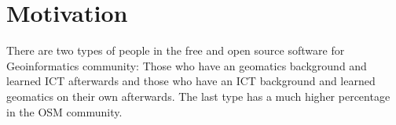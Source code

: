 \documentclass[12pt, a4paper]{report}   	%
\begin{document}


\chapter{Motivation}
There are two types of people in the free and open source software for Geoinformatics community: Those who have an geomatics background and learned ICT afterwards and those who have an ICT background and learned geomatics on their own afterwards. The last type has a much higher percentage in the OSM community. 



%
%






%


\end{document}
